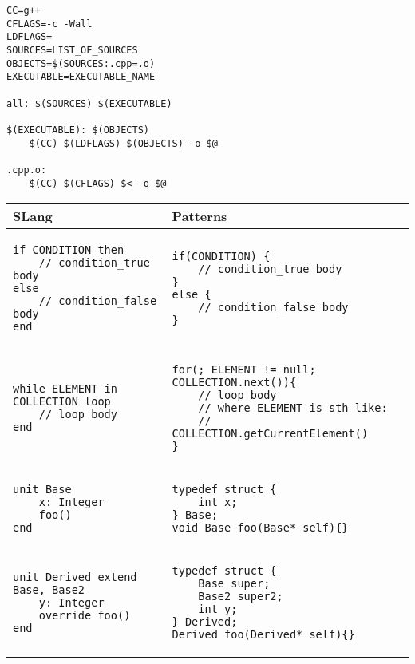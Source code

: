 \begin{lstlisting}[caption={C make file pattern}, label={lst:C_make}]
CC=g++
CFLAGS=-c -Wall
LDFLAGS=
SOURCES=LIST_OF_SOURCES
OBJECTS=$(SOURCES:.cpp=.o)
EXECUTABLE=EXECUTABLE_NAME

all: $(SOURCES) $(EXECUTABLE)
	
$(EXECUTABLE): $(OBJECTS) 
	$(CC) $(LDFLAGS) $(OBJECTS) -o $@

.cpp.o:
	$(CC) $(CFLAGS) $< -o $@
\end{lstlisting}
\begin{center}
\begin{tabular}{ | l | l | } \hline
SLang & Patterns \\ \hline
\begin{lstlisting}
if CONDITION then
    // condition_true body
else
    // condition_false body
end
\end{lstlisting} & 
\begin{lstlisting}
if(CONDITION) {
    // condition_true body    
}
else {
    // condition_false body
}
\end{lstlisting} \\ \hline

\begin{lstlisting}
while ELEMENT in COLLECTION loop
    // loop body
end
\end{lstlisting} & 
\begin{lstlisting}
for(; ELEMENT != null; COLLECTION.next()){
    // loop body
    // where ELEMENT is sth like:
    // COLLECTION.getCurrentElement()
}
\end{lstlisting} \\ \hline

\begin{lstlisting}
unit Base
    x: Integer
    foo()
end
\end{lstlisting} & 
\begin{lstlisting}
typedef struct {
    int x;
} Base;
void Base_foo(Base* self){}
\end{lstlisting} \\ \hline

\begin{lstlisting}
unit Derived extend Base, Base2
    y: Integer
    override foo()
end
\end{lstlisting} & 
\begin{lstlisting}
typedef struct {
    Base super;
    Base2 super2;
    int y;
} Derived;
Derived_foo(Derived* self){}
\end{lstlisting} \\ \hline


\end{tabular}
\end{center}
